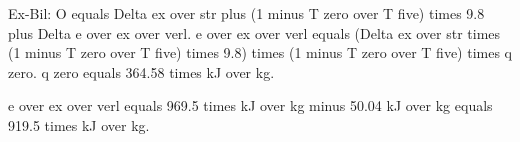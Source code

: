 Ex-Bil: O equals Delta ex over str plus (1 minus T zero over T five) times 9.8 plus Delta e over ex over verl.
e over ex over verl equals (Delta ex over str times (1 minus T zero over T five) times 9.8) times (1 minus T zero over T five) times q zero.
q zero equals 364.58 times kJ over kg.

e over ex over verl equals 969.5 times kJ over kg minus 50.04 kJ over kg equals 919.5 times kJ over kg.